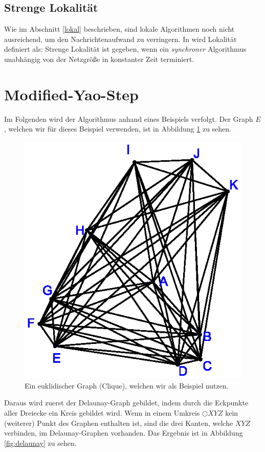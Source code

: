 \documentclass[a4paper,twoside]{IEEEtran}
\begin{document}
\subsection{Strenge Lokalität}
Wie im Abschnitt \ref{lokal} beschrieben, sind lokale Algorithmen noch nicht ausreichend, um den Nachrichtenaufwand zu verringern.
In \cite{strictlyLocal} wird Lokalität definiert als:
Strenge Lokalität ist gegeben, wenn ein \emph{synchroner} Algorithmus unabhängig von der Netzgröße in konstanter Zeit terminiert.



\section{Modified-Yao-Step}
Im Folgenden wird der Algorithmus anhand eines Beispiels verfolgt.
Der Graph $E $, welchen wir für dieses Beispiel verwenden, ist in Abbildung \ref{fig:beispielgraph} zu sehen.

\begin{figure}[h!]
\centering
\includegraphics[width=0.6\linewidth]{beispielgraph.eps}
\caption{Ein euklidischer Graph (Clique), welchen wir als Beispiel nutzen.}
\label{fig:beispielgraph}
\end{figure}

Daraus wird zuerst der Delaunay-Graph gebildet, indem durch die Eckpunkte aller Dreiecke ein Kreis gebildet wird.
Wenn in einem Umkreis $\bigcirc{XYZ} $ kein (weiterer) Punkt des Graphen enthalten ist, sind die drei Kanten, welche $XYZ $ verbinden, im Delaunay-Graphen vorhanden.
Das Ergebnis ist in Abbildung \ref{fig:delaunay} zu sehen.
\end{document}
